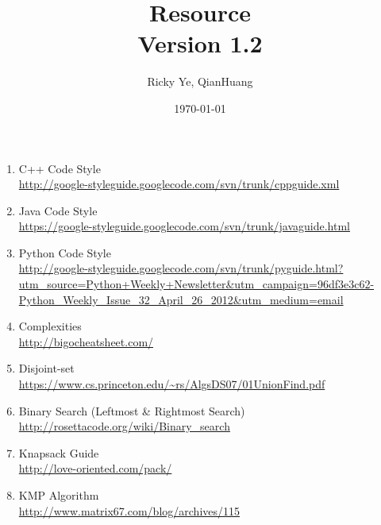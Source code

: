 \documentclass[paper=a4, fontsize=11pt]{scrartcl} %
\begin{document}
\title{Resource\\\textnormal{\small{Version 1.2}}}
\author{Ricky Ye, QianHuang}
\date{\today}
\maketitle

\begin{enumerate}[label=\upshape(\arabic*\upshape)]
  \item C++ Code Style\\ \url{http://google-styleguide.googlecode.com/svn/trunk/cppguide.xml}
  \item Java Code Style\\ \url{https://google-styleguide.googlecode.com/svn/trunk/javaguide.html}
  \item Python Code Style\\ \url{http://google-styleguide.googlecode.com/svn/trunk/pyguide.html?utm_source=Python+Weekly+Newsletter&utm_campaign=96df3e3c62-Python_Weekly_Issue_32_April_26_2012&utm_medium=email}
  \item Complexities\\ \url{http://bigocheatsheet.com/}
  \item Disjoint-set\\ \url{https://www.cs.princeton.edu/~rs/AlgsDS07/01UnionFind.pdf}
  \item Binary Search (Leftmost \& Rightmost Search)\\ \url{http://rosettacode.org/wiki/Binary_search} 
  \item Knapsack Guide\\ \url{http://love-oriented.com/pack/}
  \item KMP Algorithm\\ \url{http://www.matrix67.com/blog/archives/115}
\end{enumerate}
\end{document}
